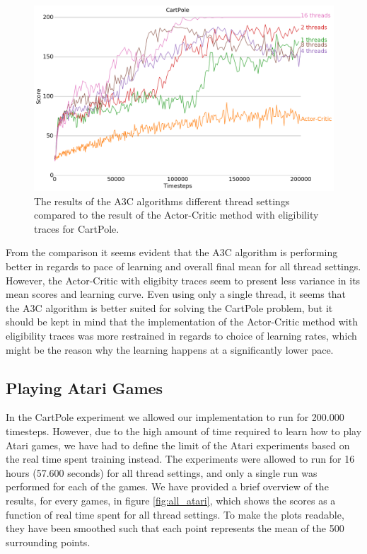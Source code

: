 \documentclass[11pt]{article}
\begin{document}
\begin{figure}[H]
    \centering
    \includegraphics[scale=0.4]{plots/cartpole_compare_counter_with_AC.png}
    \caption{The results of the A3C algorithms different thread
            settings compared to the result of the Actor-Critic method
            with eligibility traces for CartPole.}
    \label{fig:a3c_comp_eligibility}
\end{figure}

From the comparison it seems evident that the A3C algorithm is performing
better in regards to pace of learning and overall final mean for all thread settings.
However, the Actor-Critic with eligibity traces seem to present less variance
in its mean scores and learning curve.
Even using only a single thread, it seems that the A3C algorithm
is better suited for solving the CartPole problem, but it should
be kept in mind that the implementation of the Actor-Critic method
with eligibility traces was more restrained in regards to choice of
learning rates, which might be the reason why the learning happens
at a significantly lower pace.

\subsection{Playing Atari Games}

In the CartPole experiment we allowed our implementation to run for 200.000 timesteps.
However, due to the high amount of time required to
learn how to play Atari games, we have had to define the limit of the
Atari experiments based on the real time spent training instead.
The experiments were allowed to run for 16 hours (57.600 seconds)
for all thread settings, and only a single run was performed for
each of the games.
We have provided a brief overview of the results, for every games, in figure \ref{fig:all_atari},
which shows the scores as a function of real time spent for all
thread settings.
To make the plots readable, they have been smoothed such that
each point represents the mean of the 500 surrounding points.
\end{document}
